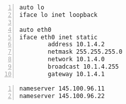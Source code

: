 \documentclass[Configuration]{subfiles}
\begin{document}
\begin{lstlisting}[frame=single,caption=/etc/network/interfaces,backgroundcolor=\color{gray},breaklines=true,numbers=left,]
auto lo
iface lo inet loopback

auto eth0
iface eth0 inet static
        address 10.1.4.2
        netmask 255.255.255.0
        network 10.1.4.0
        broadcast 10.1.4.255
        gateway 10.1.4.1
\end{lstlisting}

\begin{lstlisting}[frame=single,caption=/etc/resolv.conf,backgroundcolor=\color{gray},breaklines=true,numbers=left,]
nameserver 145.100.96.11
nameserver 145.100.96.22
\end{lstlisting}
\end{document}
